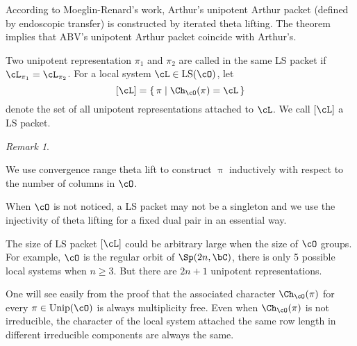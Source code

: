 \documentclass[12pt,a4paper]{amsart}
\numberwithin{equation}{section}
\newtheorem{thm}{Theorem}[section]
\theoremstyle{remark}
\newtheorem*{remark}{Remark}
\def\Thetab{\bar{\Theta}}
\def\drc{\mathrm{DRC}}
\def\LS{\mathrm{LS}}
\def\Unip{\mathrm{Unip}}
\begin{document}


{\color{red} According to Moeglin-Renard's work, Arthur's unipotent Arthur packet
  (defined by endoscopic transfer) is constructed by iterated theta lifting.
  The theorem implies that ABV's unipotent Arthur packet coincide with Arthur's.}


Two unipotent representation $\pi_{1}$ and $\pi_{2}$ are called in the same
LS packet if $\cL_{\pi_{1}} = \cL_{\pi_{2}}$.
For a local system $\cL\in \LS(\cO)$, let
\[
  [\cL] = \set{\pi |\Ch_{\cO}(\pi) = \cL}
\]
denote the set of all unipotent representations attached to $\cL$. We call
$[\cL]$ a  LS packet.

\begin{remark}
  \begin{enumR}
    \item
    We use convergence range theta lift to construct $\uppi$ inductively with
    respect to the number of columns in $\cO$.
    \item
    When $\cO$ is not noticed, a LS packet may not be a singleton
    and we use the injectivity of theta lifting for a fixed dual pair in an essential way.
    \item
    The size of LS packet $[\cL]$ could be arbitrary large  when the size of $\cO$
    groups.
    For example, $\cO$ is the regular orbit of $\Sp(2n,\bC)$, there is only 5 possible
    local systems when $n\geq 3$. But there are $2n+1$ unipotent
    representations. %
    \item One will see easily from the proof that the associated character
    $\Ch_{\cO}(\pi)$ for every $\pi\in \Unip(\cO)$ is always multiplicity free.
    Even when $\Ch_{\cO}(\pi)$ is not irreducible, the character of the local
    system attached the same row length in different irreducible components are
    always the same.
  \end{enumR}
\end{remark}
\end{document}
